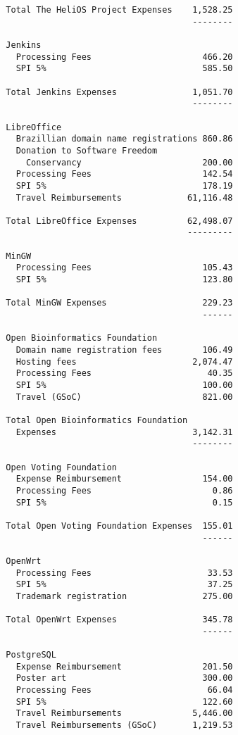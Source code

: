 \documentclass[letterpaper]{report}
\begin{document}
\begin{verbatim}
  Total The HeliOS Project Expenses    1,528.25
                                       --------

  Jenkins
    Processing Fees                      466.20
    SPI 5%                               585.50

  Total Jenkins Expenses               1,051.70
                                       --------

  LibreOffice
    Brazillian domain name registrations 860.86
    Donation to Software Freedom
      Conservancy                        200.00
    Processing Fees                      142.54
    SPI 5%                               178.19
    Travel Reimbursements             61,116.48

  Total LibreOffice Expenses          62,498.07
                                      ---------

  MinGW
    Processing Fees                      105.43
    SPI 5%                               123.80

  Total MinGW Expenses                   229.23
                                         ------

  Open Bioinformatics Foundation
    Domain name registration fees        106.49
    Hosting fees                       2,074.47
    Processing Fees                       40.35
    SPI 5%                               100.00
    Travel (GSoC)                        821.00

  Total Open Bioinformatics Foundation
    Expenses                           3,142.31
                                       --------

  Open Voting Foundation
    Expense Reimbursement                154.00
    Processing Fees                        0.86
    SPI 5%                                 0.15

  Total Open Voting Foundation Expenses  155.01
                                         ------

  OpenWrt
    Processing Fees                       33.53
    SPI 5%                                37.25
    Trademark registration               275.00

  Total OpenWrt Expenses                 345.78
                                         ------

  PostgreSQL
    Expense Reimbursement                201.50
    Poster art                           300.00
    Processing Fees                       66.04
    SPI 5%                               122.60
    Travel Reimbursements              5,446.00
    Travel Reimbursements (GSoC)       1,219.53


\end{verbatim}
\end{document}
